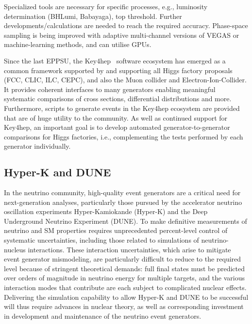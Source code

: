 \documentclass[10pt,a4paper]{article}
\begin{document}
Specialized tools are necessary for specific processes, e.g., luminosity
determination (BHLumi, Babayaga), top threshold. Further
developments/calculations are needed to reach the required accuracy. Phase-space
sampling is being improved with adaptive multi-channel versions of VEGAS or
machine-learning methods, and can utilise GPUs.

Since the last EPPSU, the Key4hep~\cite{Ganis2022, Sailer:2020fah} software ecosystem has
emerged as a common framework supported by and supporting all Higgs factory proposals
(FCC, CLIC, ILC, CEPC), and also the Muon collider and
Electron-Ion-Collider. It provides coherent interfaces to many
generators enabling meaningful systematic comparisons of cross
sections, differential distributions and more. Furthermore, scripts to
generate events in the Key4hep ecosystem are provided that are of huge
utility to the community. As well as continued support for Key4hep, an
important goal is to develop automated generator-to-generator
comparisons for Higgs factories, i.e., complementing the tests performed
by each generator individually.

\subsection{Hyper-K and DUNE}\label{hyper-k-and-dune}

In the neutrino community, high-quality event generators are a critical need for
next-generation analyses, particularly those pursued by the accelerator neutrino
oscillation experiments Hyper-Kamiokande (Hyper-K) and the Deep Underground
Neutrino Experiment (DUNE). To make definitive measurements of neutrino and SM
properties requires unprecedented percent-level control of systematic
uncertainties, including those related to simulations of neutrino-nucleus
interactions. These interaction uncertainties, which arise to mitigate event
generator mismodeling, are particularly difficult to reduce to the required
level because of stringent theoretical demands: full final states must be
predicted over orders of magnitude in neutrino energy for multiple targets, and
the various interaction modes that contribute are each subject to complicated
nuclear effects. Delivering the simulation capability to allow Hyper-K and DUNE
to be successful will thus require advances in nuclear theory, as well as
corresponding investment in development and maintenance of the neutrino event
generators.
\end{document}
